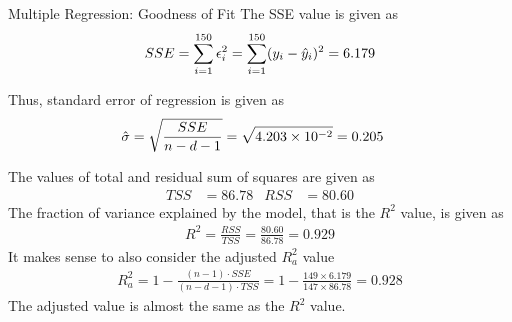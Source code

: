 \begin{frame}{Multiple Regression: Goodness of Fit}
    The SSE value is given as
    \begin{align*}
        SSE = \sum_{i=1}^{150} \epsilon_i^2 
        = \sum_{i=1}^{150} (y_i - \hat{y}_i)^2 = 6.179
    \end{align*}
    
    Thus, standard error of regression is given as
    \begin{align*}
        \hat{\sigma} & = \sqrt{\frac{SSE}{n-d-1}} = \sqrt{4.203 \times
        10^{-2}} = 0.205
    \end{align*}
    
    The values of total and residual sum of squares are given as
    \begin{align*}
        TSS & = 86.78 & RSS & = 80.60
    \end{align*}
    The fraction of variance explained by the model, that is the $R^2$
    value, is given as
    \begin{align*}
        R^2 = \frac{RSS}{TSS} = \frac{80.60}{86.78} = 0.929
    \end{align*}
    It makes sense to also consider the adjusted $R_a^2$ value
    \begin{align*}
    R_a^2 = 1 - \frac{(n-1) \cdot SSE}{ (n-d-1) \cdot TSS} 
    =  1 - \frac{149 \times 6.179}{ 147 \times 86.78} = 0.928 
    \end{align*}
    The adjusted value is almost the same as the $R^2$ value.

\end{frame}
%
